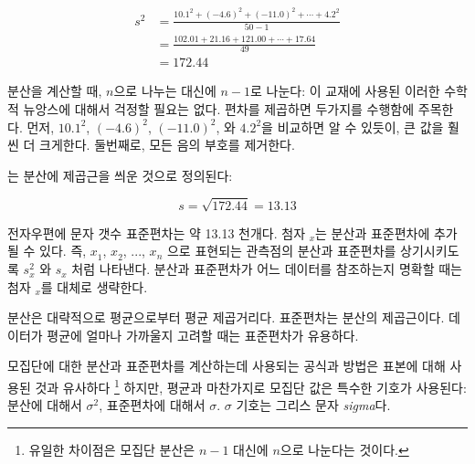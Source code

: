 \begin{align*}
s_{}^2 &= \frac{10.1_{}^2 + (-4.6)_{}^2 + (-11.0)_{}^2 + \cdots + 4.2_{}^2}{50-1} \\
	&= \frac{102.01 + 21.16 + 121.00 + \cdots + 17.64}{49} \\
	&= 172.44
\end{align*}

분산을 계산할 때, $n$으로 나누는 대신에 $n-1$로 나눈다: 
이 교재에 사용된 이러한 수학적 뉴앙스에 대해서 걱정할 필요는 없다.
편차를 제곱하면 두가지를 수행함에 주목한다.
먼저, $10.1^2$, $(-4.6)^2$, $(-11.0)^2$, 와 $4.2^2$을 비교하면 알 수 있듯이, 큰 값을 훨씬 더 크게한다.
둘번째로, 모든 음의 부호를 제거한다.

는 분산에 제곱근을 씌운 것으로 정의된다:

$$s=\sqrt{172.44} = 13.13$$
 

전자우편에 문자 갯수 표준편차는 약 13.13 천개다.
첨자 $_x$는 분산과 표준편차에 추가될 수 있다. 즉, $x_1^{}$, $x_2^{}$, ..., $x_n^{}$ 으로 표현되는 관측점의 분산과 표준편차를 상기시키도록 $s_x^2$ 와 $s_x^{}$ 처럼 나타낸다.
분산과 표준편차가 어느 데이터를 참조하는지 명확할 때는 첨자 $_{x}$를 대체로 생략한다.

\begin{termBox}{
분산은 대략적으로 평균으로부터 평균 제곱거리다.
표준편차는 분산의 제곱근이다. 
데이터가 평균에 얼마나 가까울지 고려할 때는 표준편차가 유용하다.}
\end{termBox}

모집단에 대한 분산과 표준편차를 계산하는데 사용되는 공식과 방법은 표본에 대해 사용된 것과 유사하다
\footnote{유일한 차이점은 모집단 분산은 $n-1$ 대신에 $n$으로 나눈다는 것이다.}
하지만, 평균과 마찬가지로 모집단 값은 특수한 기호가 사용된다: 분산에 대해서 $\sigma_{}^2$,
표준편차에 대해서 $\sigma$.
$\sigma$  기호는 그리스 문자 \emph{sigma}다.


